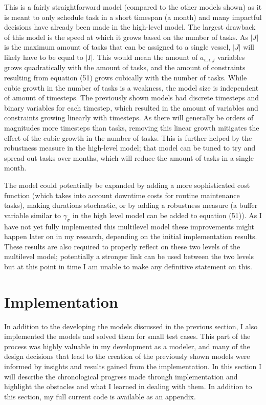 \documentclass[a4paper,12pt]{article}
\begin{document}
\bigskip

This is a fairly straightforward model (compared to the other models shown) as it is meant to only schedule task in a short timespan (a month) and many impactful decisions have already been made in the high-level model. The largest drawback of this model is the speed at which it grows based on the number of tasks. As $|J|$ is the maximum amount of tasks that can be assigned to a single vessel, $|J|$ will likely have to be equal to $|I|$. This would mean the amount of $a_{v,i,j}$ variables grows quadratically with the amount of tasks, and the amount of constraints resulting from equation (51) grows cubically with the number of tasks. While cubic growth in the number of tasks is a weakness, the model size is independent of amount of timesteps. The previously shown models had discrete timesteps and binary variables for each timestep, which resulted in the amount of variables and constraints growing linearly with timesteps. As there will generally be orders of magnitudes more timesteps than tasks, removing this linear growth mitigates the effect of the cubic growth in the number of tasks. This is further helped by the robustness measure in the high-level model; that model can be tuned to try and spread out tasks over months, which will reduce the amount of tasks in a single month. 

The model could potentially be expanded by adding a more sophisticated cost function (which takes into account downtime costs for routine maintenance tasks), making durations stochastic, or by adding a robustness measure (a buffer variable similar to $\gamma_\sigma$ in the high level model can be added to equation (51)). As I have not yet fully implemented this multilevel model these improvements might happen later on in my research, depending on the initial implementation results. These results are also required to properly reflect on these two levels of the multilevel model; potentially a stronger link can be used between the two levels but at this point in time I am unable to make any definitive statement on this. 

\pagebreak

\section{Implementation}\label{s:impl}
In addition to the developing the models discussed in the previous section, I also implemented the models and solved them for small test cases. This part of the process was highly valuable in my development as a modeler, and many of the design decisions that lead to the creation of the previously shown models were informed by insights and results gained from the implementation. In this section I will describe the chronological progress made through implementation and highlight the obstacles and what I learned in dealing with them. In addition to this section, my full current code is available as an appendix.  %
\end{document}
